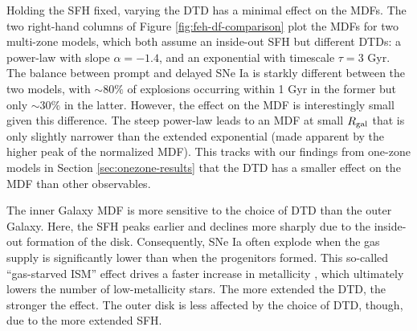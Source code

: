 \documentclass[twocolumn,twocolappendix,linenumbers]{aastex631}
\begin{document}
Holding the SFH fixed, varying the DTD has a minimal effect on the MDFs. The two right-hand columns of Figure \ref{fig:feh-df-comparison} plot the MDFs for two multi-zone models, which both assume an inside-out SFH but different DTDs: a power-law with slope $\alpha=-1.4$, and an exponential with timescale $\tau=3$ Gyr. The balance between prompt and delayed SNe Ia is starkly different between the two models, with $\sim 80\%$ of explosions occurring within 1 Gyr in the former but only $\sim 30\%$ in the latter. However, the effect on the MDF is interestingly small given this difference. The steep power-law leads to an MDF at small $R_{\rm gal}$ that is only slightly narrower than the extended exponential (made apparent by the higher peak of the normalized MDF). This tracks with our findings from one-zone models in Section \ref{sec:onezone-results} that the DTD has a smaller effect on the MDF than other observables.

The inner Galaxy MDF is more sensitive to the choice of DTD than the outer Galaxy. Here, the SFH peaks earlier and declines more sharply due to the inside-out formation of the disk. Consequently, SNe Ia often explode when the gas supply is significantly lower than when the progenitors formed. This so-called ``gas-starved ISM'' effect drives a faster increase in metallicity \citep[see analytic demonstration in][]{Weinberg2017-ChemicalEquilibrium}, which ultimately lowers the number of low-metallicity stars. The more extended the DTD, the stronger the effect. The outer disk is less affected by the choice of DTD, though, due to the more extended SFH.
\end{document}
